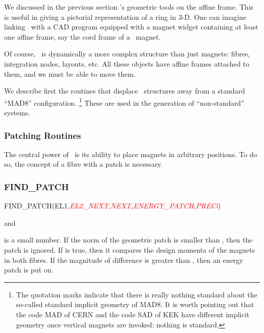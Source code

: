 %
We discussed in the previous section \PTC's geometric tools on the
affine frame. This is useful in giving a pictorial representation of a ring
in 3-D. One can imagine linking \PTC\ with a CAD program equipped
with a magnet widget containing at least one affine frame, say the
cord frame  of a \PTC\ magnet.

Of course, \PTC\ is dynamically a more complex structure than just
magnets: fibres, integration nodes, layouts, etc. All these objects
have affine frames attached to them, and we must be able to move them.

%
We describe first the routines that displace \PTC\ structures away from
a standard ``MAD8'' configuration.%
\footnote{The quotation marks indicate that there is really nothing standard
about the so-called standard implicit geometry of MAD8. It is worth
pointing out that the code MAD of CERN and the code SAD of KEK have
different implicit geometry once vertical magnets are invoked: nothing
is standard.%
} These are used in the generation of ``non-standard'' systems.


\subsubsection{Patching Routines}

%
The central power of \PTC\ is its ability to place magnets in arbitrary
positions. To do so, the concept of a fibre with a patch is necessary.


\subsubsection*{FIND\_PATCH}

%
\begin{ptccode}
FIND_PATCH(EL1\textit{\textcolor{red}{,EL2_NEXT,NEXT,ENERGY_PATCH,PRECi}})
\end{ptccode}

 and 

%
 is a small  number.  If the norm of the geometric patch is
smaller than , then the patch is ignored. If  is true,
then it compares the design momenta of the magnets in both fibres. If the magnitude
of difference is greater than , then an energy patch is put on.


